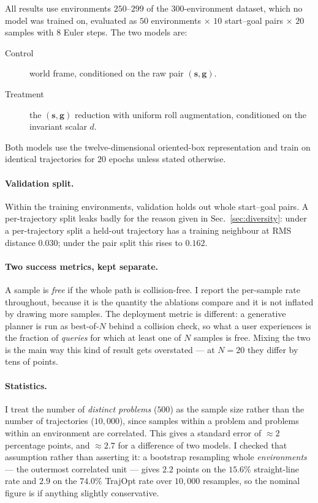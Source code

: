 \documentclass[11pt,a4paper]{article}
\newcommand{\svec}{\mathbf{s}}
\newcommand{\gvec}{\mathbf{g}}
\begin{document}
All results use environments $250$--$299$ of the $300$-environment dataset, which
no model was trained on, evaluated as $50$ environments $\times$ $10$ start--goal
pairs $\times$ $20$ samples with $8$ Euler steps. The two models are:

\begin{description}
  \item[Control] world frame, conditioned on the raw pair $(\svec, \gvec)$.
  \item[Treatment] the $(\svec,\gvec)$ reduction with uniform roll augmentation,
  conditioned on the invariant scalar $d$.
\end{description}

Both models use the twelve-dimensional oriented-box representation and train on
identical trajectories for $20$ epochs unless stated otherwise.

\paragraph{Validation split.} Within the training environments, validation holds
out whole start--goal pairs. A per-trajectory split leaks badly for the reason
given in Sec.~\ref{sec:diversity}: under a per-trajectory split a held-out
trajectory has a training neighbour at RMS distance $0.030$; under the pair split
this rises to $0.162$.

\paragraph{Two success metrics, kept separate.} A sample is \emph{free} if the
whole path is collision-free. I report the per-sample rate throughout, because it
is the quantity the ablations compare and it is not inflated by drawing more
samples. The deployment metric is different: a generative planner is run as
best-of-$N$ behind a collision check, so what a user experiences is the fraction
of \emph{queries} for which at least one of $N$ samples is free. Mixing the two
is the main way this kind of result gets overstated --- at $N=20$ they differ by
tens of points.

\paragraph{Statistics.} I treat the number of \emph{distinct problems} ($500$) as
the sample size rather than the number of trajectories ($10{,}000$), since
samples within a problem and problems within an environment are correlated. This
gives a standard error of $\approx 2$ percentage points, and $\approx 2.7$ for a
difference of two models. I checked that assumption rather than asserting it: a
bootstrap resampling whole \emph{environments} --- the outermost correlated unit
--- gives $2.2$ points on the $15.6\%$ straight-line rate and $2.9$ on the
$74.0\%$ TrajOpt rate over $10{,}000$ resamples, so the nominal figure is if
anything slightly conservative.
\end{document}
